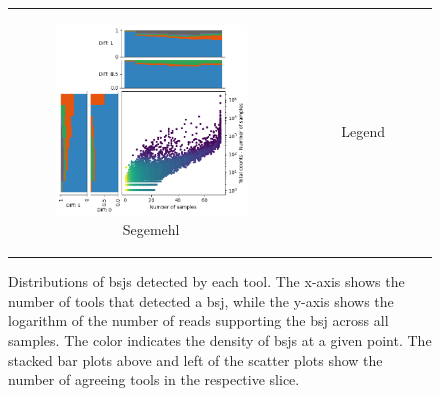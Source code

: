 \begin{figure}[ht]
\begin{tabular}{cc}
\begin{subfigure}{.4\textwidth}
            \includegraphics[width=\linewidth]{chapters/4_results_and_discussion/figures/detection/density/segemehl.png}
            \caption{Segemehl}
            \label{fig:detection_density_segemehl}
        \end{subfigure}
         &
        \begin{subfigure}{.4\textwidth}
            \centering
            \caption{Legend}
        \end{subfigure}
    \end{tabular}
    \caption{Distributions of \gls{bsj}s detected by each tool.
        The x-axis shows the number of tools that detected a \gls{bsj}, while the
        y-axis shows the logarithm of the number of reads supporting the \gls{bsj}
        across all samples.
        The color indicates the density of \gls{bsj}s at a given point.
        The stacked bar plots above and left of the scatter plots show the number of
        agreeing tools in the respective slice.
    }
    \label{fig:detection_density}
\end{figure}
